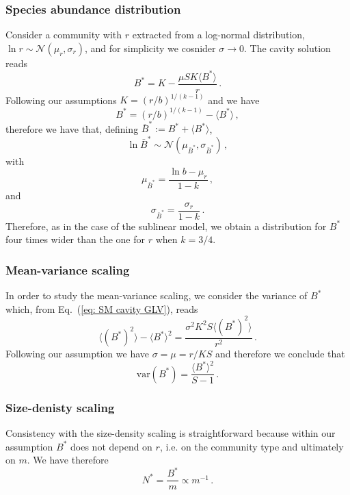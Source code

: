 \documentclass[10pt]{article}
\begin{document}
\subsubsection{Species abundance distribution}
Consider a community with $r$ extracted from a log-normal
distribution, $\ln{r}\sim\mathcal{N}(\mu_r, \sigma_r)$,
and for simplicity we cosnider $\sigma\to 0$.
The cavity solution reads
\begin{equation}
    B^* = K - \frac{\mu S K\langle B^*\rangle}{r} \, .
\end{equation}
Following our assumptions $K=(r/b)^{1/(k-1)}$ and we have
\begin{equation}
    B^* = (r/b)^{1/(k-1)} - \langle B^*\rangle \, ,
\end{equation}
therefore we have that, defining $\bar{B}^*:=B^*+\langle B^*\rangle$,
\begin{equation}
    \ln{\bar{B}^*} \sim \mathcal{N}(\mu_{\bar{B}^*},\sigma_{\bar{B}^*}) \, ,
\end{equation}
with
\begin{equation}
    \mu_{\bar{B}^*} = \frac{\ln{b}-\mu_r}{1-k} \, ,
\end{equation}
and
\begin{equation}
    \sigma_{\bar{B}^*} = \frac{\sigma_r}{1-k} \, .
\end{equation}
Therefore, as in the case of the sublinear model, 
we obtain a distribution 
for $B^*$ four times wider than the one for $r$
when $k=3/4$. 

\subsubsection{Mean-variance scaling}
In order to study the mean-variance scaling, 
we consider the variance of $B^*$ which,
from Eq.~(\ref{eq: SM cavity GLV}), reads
\begin{equation}
    \langle (B^*)^2 \rangle - \langle B^* \rangle^2 = 
    \frac{\sigma^2K^2S\langle (B^*)^2\rangle}{r^2} \, .
\end{equation}
Following our assumption we have $\sigma=\mu =r /KS$ and 
therefore we conclude that
\begin{equation}
    \textrm{var}(B^*) = \frac{\langle B^* \rangle^2}{S-1} \, .
\end{equation}

\subsubsection{Size-denisty scaling}
Consistency with the size-density scaling is straightforward
because within our assumption $B^*$ does not depend
on $r$, i.e. on the community type and ultimately on $m$.
We have therefore
\begin{equation}
    N^* = \frac{B^*}{m} \propto m^{-1} \, .
\end{equation}
\end{document}
